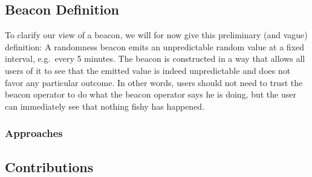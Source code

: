 

\subsection{Beacon Definition}
To clarify our view of a beacon, we will for now give this preliminary (and vague) definition: A randomness beacon emits an unpredictable random value at a fixed interval, e.g.\ every 5 minutes. The beacon is constructed in a way that allows all users of it to see that the emitted value is indeed unpredictable and does not favor any particular outcome. In other words, users should not need to trust the beacon operator to do what the beacon operator says he is doing, but the user can immediately see that nothing fishy has happened.


\subsubsection{Approaches}


\subsection{Contributions}



